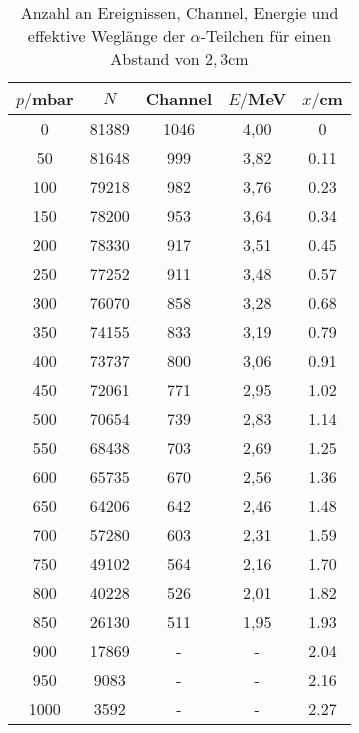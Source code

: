 \begin{table}[H]
  \centering
  \caption{Anzahl an Ereignissen, Channel, Energie und  effektive Weglänge der $\alpha$-Teilchen für einen Abstand von $2,3$cm}
  \label{tab:bla}
  \begin{tabular}{c c c c c}
    \toprule
    $p/$mbar & $N$ & Channel & $E/$MeV & $x/$cm  \\%
    \midrule
    0	  & 81389  &1046 &  4,00& 0       \\ %
    50	& 81648  & 999 &  3,82&  0.11    \\ %
    100 & 79218  & 982 &  3,76& 0.23    \\ %
    150 & 78200  & 953 &  3,64& 0.34    \\ %
    200 & 78330  & 917 &  3,51& 0.45    \\ %
    250 & 77252  & 911 &  3,48& 0.57    \\ %
    300 & 76070  & 858 &  3,28& 0.68    \\ %
    350 & 74155  & 833 &  3,19& 0.79    \\ %
    400 & 73737  & 800 &  3,06& 0.91    \\ %
    450 & 72061  & 771 &  2,95& 1.02    \\ %
    500 & 70654  & 739 &  2,83& 1.14    \\ %
    550 & 68438  & 703 &  2,69& 1.25    \\ %
    600 & 65735  & 670 &  2,56& 1.36    \\ %
    650 & 64206  & 642 &  2,46& 1.48    \\ %
    700 & 57280  & 603 &  2,31& 1.59    \\ %
    750 & 49102  & 564 &  2,16& 1.70    \\ %
    800 & 40228  & 526 &  2,01& 1.82    \\ %
    850 & 26130  & 511 &  1,95& 1.93    \\ %
    900 & 17869  &  -  & -    & 2.04    \\ %
    950 & 9083	 &  -  & -    &  2.16    \\ %
    1000& 3592   &  -  & -    & 2.27    \\ %
    \bottomrule
  \end{tabular}
\end{table}





